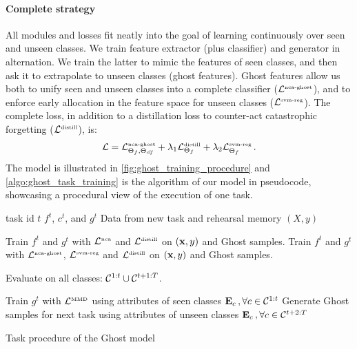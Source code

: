 \paragraph{Complete strategy} All modules and losses fit neatly into the goal of learning
continuously over seen and unseen classes. We train feature extractor (plus classifier) and
generator in alternation. We train the latter to mimic the features of seen classes, and then ask it
to extrapolate to unseen classes (ghost features). Ghost features allow us both to unify seen and
unseen classes into a complete classifier ($\mathcal{L}^\text{\tiny{nca-ghost}}$), and to enforce early
allocation in the feature space for unseen classes ($\mathcal{L}^\text{\tiny{svm-reg}}$). The complete
loss, in addition to a distillation loss to counter-act catastrophic forgetting
($\mathcal{L}^\text{\tiny{distill}}$), is:
%
\begin{equation}
    \mathcal{L} = \mathcal{L}^\text{\tiny{nca-ghost}}_{\Theta_f,\Theta_{\textit{clf}}} + \lambda_1 \mathcal{L}^\text{\tiny{distill}}_{\Theta_f} + \lambda_2 \mathcal{L}^\text{\tiny{svm-reg}}_{\Theta_f}\,.
    \label{eq:ghost_loss}
\end{equation}
%
The model is illustrated in \autoref{fig:ghost_training_procedure} and \autoref{algo:ghost_task_training} is the
algorithm of our model in pseudocode, showcasing a procedural view of the execution of one task.

\begin{algorithm}
    \begin{algorithmic}[1]
        \Require
        \Statex task id $t$
        \Statex $f^t$, $c^t$, and $g^t$
        \Statex Data from new task and rehearsal memory $(X, y)$

         \State Train $f^t$ and $g^t$ with $\mathcal{L}^\text{\tiny{nca}}$
        and $\mathcal{L}^\text{\tiny{distill}}$ on $(\mathbf{x}, y)$ and Ghost samples. \Else \State Train $f^t$ and $g^t$
        with $\mathcal{L}^\text{\tiny{nca-ghost}}$, $\mathcal{L}^\text{\tiny{svm-reg}}$ and $\mathcal{L}^\text{\tiny{distill}}$
        on $(\mathbf{x}, y)$ and Ghost samples. \EndIf

        \State Evaluate on all classes: $\mathcal{C}^{1:t} \cup \mathcal{C}^{t+1:T}$.

         \State Train $g^t$ with $\mathcal{L}^\text{\tiny{MMD}}$ using attributes of
        seen classes $\mathbf{E}_{c} \,, \forall c \in \mathcal{C}^{1:t}$ \State Generate Ghost samples for next
        task using attributes of unseen classes $\mathbf{E}_{c} \,, \forall c \in \mathcal{C}^{t+2:T}$ \EndIf
    \end{algorithmic}
    \caption{Task procedure of the Ghost model}
    \label{algo:ghost_task_training}
\end{algorithm}


